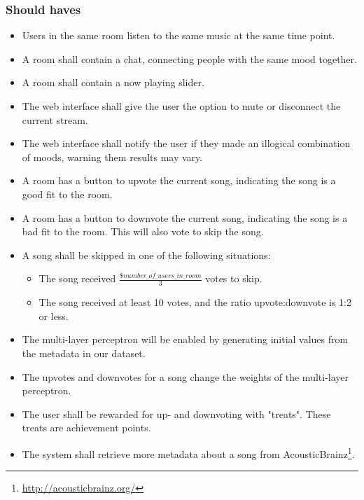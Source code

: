 \subsubsection{Should haves}
\begin{itemize}
\item Users in the same room listen to the same music at the same time point.

\item A room shall contain a chat, connecting people with the same mood together.

\item A room shall contain a now playing slider.

\item The web interface shall give the user the option to mute or disconnect the current stream.

\item The web interface shall notify the user if they made an illogical combination of moods, warning them results may vary.

\item A room has a button to upvote the current song, indicating the song is a good fit to the room.

\item A room has a button to downvote the current song, indicating the song is a bad fit to the room. This will also vote to skip the song.

\item A song shall be skipped in one of the following situations:
	\begin{itemize}
	\item The song received $\frac{\$number\_of\_users\_in\_room}{3}$ votes to skip.
	\item The song received at least 10 votes, and the ratio upvote:downvote is 1:2 or less.
	\end{itemize}

\item The multi-layer perceptron will be enabled by generating initial values from the metadata in our dataset.

\item The upvotes and downvotes for a song change the weights of the multi-layer perceptron.

\item The user shall be rewarded for up- and downvoting with "treats". These treats are achievement points.

\item The system shall retrieve more metadata about a song from AcousticBrainz\footnote{\url{http://acousticbrainz.org/}}.

\end{itemize}

